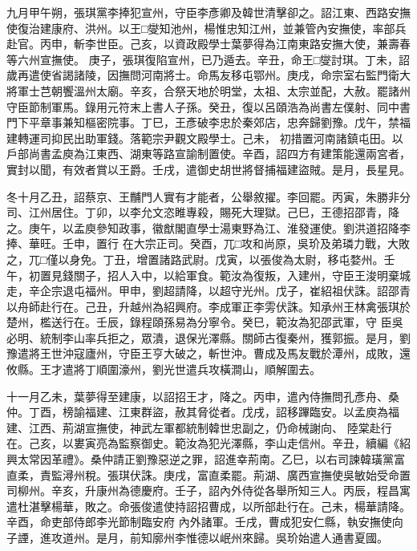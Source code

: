 \begin{pinyinscope}
 九月甲午朔，張琪黨李捧犯宣州，守臣李彥卿及韓世清擊卻之。詔江東、西路安撫使復治建康府、洪州。以王□燮知池州，楊惟忠知江州，並兼管內安撫使，率部兵赴官。丙申，斬李世臣。己亥，以資政殿學士葉夢得為江南東路安撫大使，兼壽春等六州宣撫使。
 庚子，張琪復陷宣州，已乃遁去。辛丑，命王□燮討琪。丁未，詔歲再遣使省謁諸陵，因撫問河南將士。命馬友移屯鄂州。庚戌，命宗室右監門衛大將軍士芑朝饗溫州太廟。辛亥，合祭天地於明堂，太祖、太宗並配，大赦。罷諸州守臣節制軍馬。錄用元符末上書人子孫。癸丑，復以呂頤浩為尚書左僕射、同中書門下平章事兼知樞密院事。丁巳，王彥破李忠於秦郊店，忠奔歸劉豫。戊午，禁福建轉運司抑民出助軍錢。落範宗尹觀文殿學士。己未，
 初措置河南諸鎮屯田。以戶部尚書孟庾為江東西、湖東等路宣諭制置使。辛酉，詔四方有建策能還兩宮者，實封以聞，有效者賞以王爵。壬戌，遣御史胡世將督捕福建盜賊。是月，長星見。



 冬十月乙丑，詔蔡京、王黼門人實有才能者，公舉敘擢。李回罷。丙寅，朱勝非分司、江州居住。丁卯，以李允文恣睢專殺，賜死大理獄。己巳，王德招邵青，降之。庚午，以孟庾參知政事，徽猷閣直學士湯東野為江、淮發運使。劉洪道招降李捧、華旺。壬申，置行
 在大宗正司。癸酉，兀□攻和尚原，吳玠及弟璘力戰，大敗之，兀□僅以身免。丁丑，增置諸路武尉。戊寅，以張俊為太尉，移屯婺州。壬午，初置見錢關子，招人入中，以給軍食。範汝為復叛，入建州，守臣王浚明棄城走，辛企宗退屯福州。甲申，劉超請降，以超守光州。戊子，崔紹祖伏誅。詔邵青以舟師赴行在。己丑，升越州為紹興府。李成軍正李雱伏誅。知承州王林禽張琪於楚州，檻送行在。壬辰，錄程頤孫易為分寧令。癸巳，範汝為犯邵武軍，守
 臣吳必明、統制李山率兵拒之，眾潰，退保光澤縣。關師古復秦州，獲郭振。是月，劉豫遣將王世沖寇廬州，守臣王亨大破之，斬世沖。曹成及馬友戰於潭州，成敗，還攸縣。王才遣將丁順圍濠州，劉光世遣兵攻橫澗山，順解圍去。



 十一月乙未，葉夢得至建康，以詔招王才，降之。丙申，遣內侍撫問孔彥舟、桑仲。丁酉，榜諭福建、江東群盜，赦其脅從者。戊戌，詔移蹕臨安。以孟庾為福建、江西、荊湖宣撫使，神武左軍都統制韓世忠副之，仍命械謝向、
 陸棠赴行在。己亥，以婁寅亮為監察御史。範汝為犯光澤縣，李山走信州。辛丑，續編《紹興太常因革禮》。桑仲請正劉豫惡逆之罪，詔進幸荊南。乙巳，以右司諫韓璜黨富直柔，責監潯州稅。張琪伏誅。庚戌，富直柔罷。荊湖、廣西宣撫使吳敏始受命置司柳州。辛亥，升康州為德慶府。壬子，詔內外侍從各舉所知三人。丙辰，程昌寓遣杜湛擊楊華，敗之。命張俊遣使持詔招曹成，以所部赴行在。己未，楊華請降。辛酉，命吏部侍郎李光節制臨安府
 內外諸軍。壬戌，曹成犯安仁縣，執安撫使向子諲，進攻道州。是月，前知廓州李惟德以岷州來歸。吳玠始遣人通書夏國。



\end{pinyinscope}
